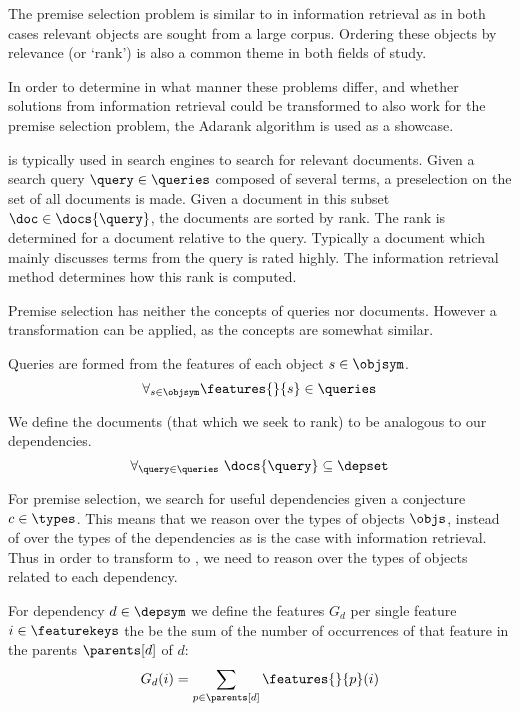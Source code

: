 The premise selection problem is similar to \ltr in information retrieval
as in both cases relevant objects are sought from a large corpus.
Ordering these objects by relevance (or `rank') is also a common theme in both fields of study.

In order to determine in what manner these problems differ, and whether solutions
from information retrieval could be transformed to also work for the premise selection problem,
the Adarank algorithm \cite{xu2007adarank} is used as a showcase.

\ltr is typically used in search engines to search for relevant documents.
Given a search query $\query \in \queries$ composed of several terms, a preselection on the set of
all documents is made. Given a document in this subset $\doc \in \docs{\query}$,
the documents are sorted by rank.
The rank is determined for a document relative to the query.
Typically a document which mainly discusses terms from the query is rated highly.
The information retrieval method determines how this rank is computed.

Premise selection has neither the concepts of queries nor documents.
However a transformation can be applied, as the concepts are somewhat similar.

\begin{definition}
  Queries are formed from the features of each object $s \in \objsym$.
  \[
    \forall_{s \in \objsym} \features{}{s} \in \queries
  \]
\end{definition}

\begin{definition}
  We define the documents (that which we seek to rank) to be analogous to our dependencies.
  \[
    \forall_{\query \in \queries}~ \docs{\query} \subseteq \depset
  \]
\end{definition}

For premise selection, we search for useful dependencies given a conjecture $c \in \types$.
This means that we reason over the types of objects $\objs$,
instead of over the types of the dependencies as is the case with information retrieval.
Thus in order to transform to \ltr, we need to reason over the types of objects related to each dependency.

\begin{definition}
  For dependency $d \in \depsym$ we define the features $G_d$ per single feature
  $i \in \featurekeys$ the be the sum of the number of occurrences of that feature
  in the parents $\parents[d]$ of $d$:
  \[
    G_d(i) = \sum_{p \in \parents[d]} \features{}{p}(i)
  \]
\end{definition}

